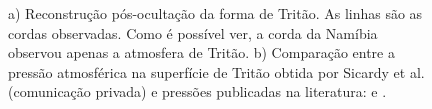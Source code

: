 \documentclass[12pt,a4paper]{monografia}
\begin{document}
\begin{figure}[h]
\begin{centering}
\caption{a) Reconstrução pós-ocultação da forma de Tritão. As linhas são as cordas observadas. Como é possível ver, a corda da Namíbia observou apenas a atmosfera de Tritão. b) Comparação entre a pressão atmosférica na superfície de Tritão obtida por Sicardy et al. (comunicação privada) e pressões publicadas na literatura: \cite{Gurola1995, Olkin1997, Sicardy1998} e \cite{Elliot2000}.
\label{Fig: Ceres-map}}
\end{centering}
\end{figure}
\end{document}
